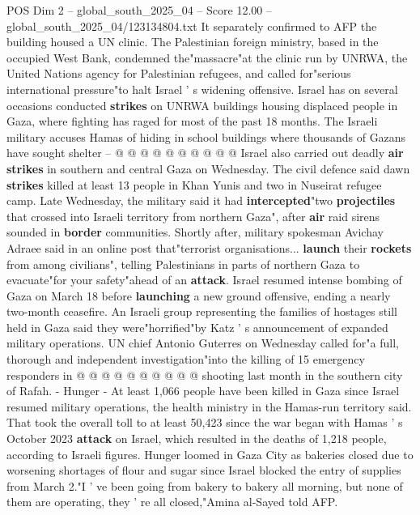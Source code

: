 \begin{textsample}{POS Dim 2 – global\_south\_2025\_04 – Score 12.00 – global\_south\_2025\_04/123134804.txt}
It separately confirmed to AFP the building housed a UN clinic.
The Palestinian foreign ministry, based in the occupied West Bank, condemned the"massacre"at the clinic run by UNRWA, the United Nations agency for Palestinian refugees, and called for"serious international pressure"to halt Israel ' s widening offensive.
Israel has on several occasions conducted \textbf{strikes} on UNRWA buildings housing displaced people in Gaza, where fighting has raged for most of the past 18 months.
The Israeli military accuses Hamas of hiding in school buildings where thousands of Gazans have sought shelter -- @ @ @ @ @ @ @ @ @ @ Israel also carried out deadly \textbf{air} \textbf{strikes} in southern and central Gaza on Wednesday.
The civil defence said dawn \textbf{strikes} killed at least 13 people in Khan Yunis and two in Nuseirat refugee camp.
Late Wednesday, the military said it had \textbf{intercepted}"two \textbf{projectiles} that crossed into Israeli territory from northern Gaza", after \textbf{air} raid sirens sounded in \textbf{border} communities.
Shortly after, military spokesman Avichay Adraee said in an online post that"terrorist organisations... \textbf{launch} their \textbf{rockets} from among civilians", telling Palestinians in parts of northern Gaza to evacuate"for your safety"ahead of an \textbf{attack}.
Israel resumed intense bombing of Gaza on March 18 before \textbf{launching} a new ground offensive, ending a nearly two-month ceasefire.
An Israeli group representing the families of hostages still held in Gaza said they were"horrified"by Katz ' s announcement of expanded military operations.
UN chief Antonio Guterres on Wednesday called for"a full, thorough and independent investigation"into the killing of 15 emergency responders in @ @ @ @ @ @ @ @ @ @ shooting last month in the southern city of Rafah. - Hunger - At least 1,066 people have been killed in Gaza since Israel resumed military operations, the health ministry in the Hamas-run territory said.
That took the overall toll to at least 50,423 since the war began with Hamas ' s October 2023 \textbf{attack} on Israel, which resulted in the deaths of 1,218 people, according to Israeli figures.
Hunger loomed in Gaza City as bakeries closed due to worsening shortages of flour and sugar since Israel blocked the entry of supplies from March 2."I ' ve been going from bakery to bakery all morning, but none of them are operating, they ' re all closed,"Amina al-Sayed told AFP.

\end{textsample}
